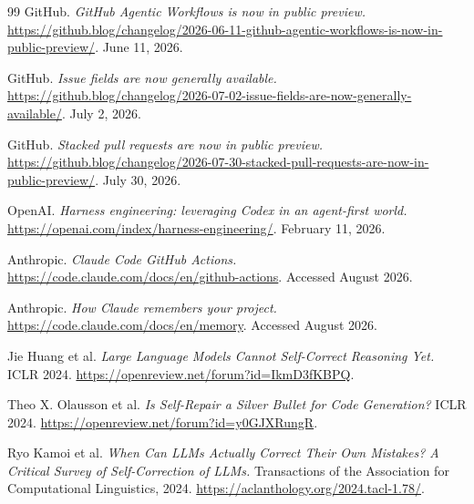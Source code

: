 \documentclass[11pt]{article}
\begin{document}
\begin{thebibliography}{99}
GitHub. \textit{GitHub Agentic Workflows is now in public preview.}
\url{https://github.blog/changelog/2026-06-11-github-agentic-workflows-is-now-in-public-preview/}.
June 11, 2026.

GitHub. \textit{Issue fields are now generally available.}
\url{https://github.blog/changelog/2026-07-02-issue-fields-are-now-generally-available/}.
July 2, 2026.

GitHub. \textit{Stacked pull requests are now in public preview.}
\url{https://github.blog/changelog/2026-07-30-stacked-pull-requests-are-now-in-public-preview/}.
July 30, 2026.

OpenAI. \textit{Harness engineering: leveraging Codex in an agent-first world.}
\url{https://openai.com/index/harness-engineering/}. February 11, 2026.

Anthropic. \textit{Claude Code GitHub Actions.}
\url{https://code.claude.com/docs/en/github-actions}. Accessed August 2026.

Anthropic. \textit{How Claude remembers your project.}
\url{https://code.claude.com/docs/en/memory}. Accessed August 2026.

Jie Huang et al. \textit{Large Language Models Cannot Self-Correct Reasoning Yet.} ICLR 2024.
\url{https://openreview.net/forum?id=IkmD3fKBPQ}.

Theo X. Olausson et al. \textit{Is Self-Repair a Silver Bullet for Code Generation?} ICLR 2024.
\url{https://openreview.net/forum?id=y0GJXRungR}.

Ryo Kamoi et al. \textit{When Can LLMs Actually Correct Their Own Mistakes? A Critical Survey of
Self-Correction of LLMs.} Transactions of the Association for Computational Linguistics, 2024.
\url{https://aclanthology.org/2024.tacl-1.78/}.

\end{thebibliography}
\end{document}
